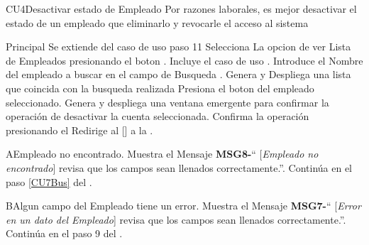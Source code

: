 \begin{UseCase}{CU4}{Desactivar estado de  Empleado}{
		Por razones laborales, es mejor desactivar el estado de un empleado que eliminarlo y revocarle el acceso al sistema
	}
	\end{UseCase}
	\begin{UCtrayectoria}{Principal}
		\UCpaso Se extiende del caso de uso  paso 11
		\UCpaso[\UCactor] Selecciona La opcion de ver Lista de  Empleados presionando el boton .
		\UCpaso Incluye el caso de uso .
		\UCpaso[\UCactor] Introduce el Nombre del empleado a buscar en el campo de Busqueda  .
		\UCpaso Genera y Despliega una lista que coincida con la busqueda realizada
		\UCpaso[\UCactor] Presiona el boton del empleado seleccionado.
		\UCpaso Genera y despliega una ventana emergente para confirmar la operación de desactivar la cuenta seleccionada.
		\UCpaso [\UCactor] Confirma la operación presionando el 
		\UCpaso Redirige al [\UCactor] a la  .
	\end{UCtrayectoria}




\begin{UCtrayectoriaA}{A}{Empleado no encontrado.}
			\UCpaso Muestra el Mensaje {\bf MSG8-}`` [{\em Empleado no encontrado}] revisa que los campos sean llenados correctamente.''.
			\UCpaso Continúa en el paso \ref{CU7Bus} del .
		\end{UCtrayectoriaA}


\begin{UCtrayectoriaA}{B}{Algun campo del Empleado tiene un error.}
			\UCpaso Muestra el Mensaje {\bf MSG7-}`` [{\em Error en un dato del Empleado}] revisa que los campos sean llenados correctamente.''.
			\UCpaso Continúa en el paso 9 del .
		\end{UCtrayectoriaA}

